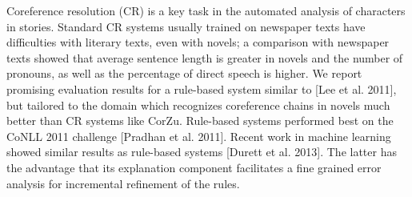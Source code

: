 Coreference resolution (CR) is a key task in the automated analysis of characters in stories. Standard CR systems usually trained on newspaper texts have difficulties with literary texts, even with novels; a comparison with newspaper texts showed that average sentence length is greater in novels and the number of pronouns, as well as the percentage of direct speech is higher. We report promising evaluation results for a rule-based system similar to [Lee et al. 2011], but tailored to the domain which recognizes coreference chains in novels much better than CR systems like CorZu. Rule-based systems performed best on the CoNLL 2011 challenge [Pradhan et al. 2011]. Recent work in machine learning showed similar results as rule-based systems [Durett et al. 2013]. The latter has the advantage that its explanation component facilitates a fine grained error analysis for incremental refinement of the rules.
